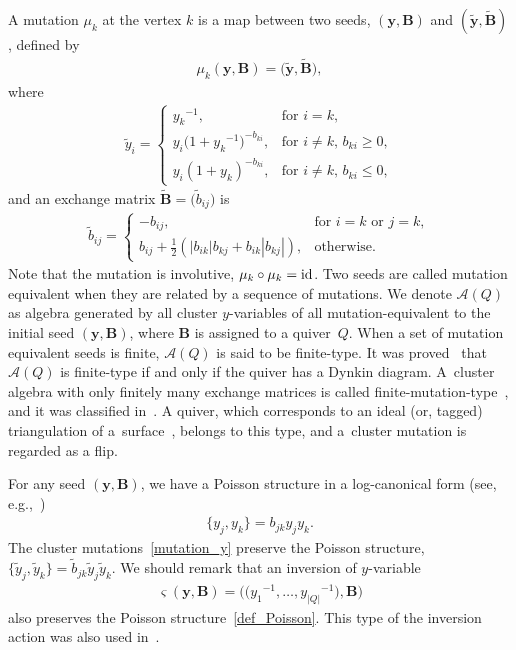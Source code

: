 \documentclass[10pt,a4paper]{amsart}
\numberwithin{equation}{section}
\begin{document}
A mutation $\mu_k$ at the vertex $k$ is a map between two seeds, $(\boldsymbol{y}, \mathbf{B})$ and $(\widetilde{\boldsymbol{y}}, \widetilde{\mathbf{B}})$, defined by
\begin{gather} \label{mutation_y}
 \mu_k( \boldsymbol{y}, \mathbf{B}) = \big(\widetilde{\boldsymbol{y}} , \widetilde{\mathbf{B}}\big) ,
\end{gather}
where
\begin{gather*}
 \widetilde{y}_i
 =
 \begin{cases}
 {y_k}^{-1} , & \text{for $i=k$}, \\
 y_i \big( 1+{y_k}^{-1} \big)^{-b_{ki}} , & \text{for $i \neq k$, $b_{ki} \geq 0$}, \\
 y_i ( 1+y_k )^{-b_{ki}} , & \text{for $i \neq k$, $b_{ki} \leq 0$},
 \end{cases}
\end{gather*}
and
an exchange matrix $ \widetilde{\mathbf{B}}= \big( \widetilde{b}_{ij} \big)$ is
\begin{gather} \label{mutation_B}
 \widetilde{b}_{ij} =
 \begin{cases}
 - b_{ij} , & \text{for $i=k$ or $j=k$}, \\
 b_{ij}+ \frac{1}{2} ( | b_{ik} | b_{kj} + b_{ik} | b_{kj} | ) , & \text{otherwise}.
 \end{cases}
\end{gather}
Note that the mutation is involutive, $\mu_k \circ \mu_k={\rm id}$. Two seeds are called mutation equivalent when they are related by a sequence of mutations. We denote $\mathcal{A}(Q)$ as algebra generated by all cluster
$y$-variables of all mutation-equivalent to the initial seed $(\boldsymbol{y}, \mathbf{B})$, where $\mathbf{B}$ is assigned to a quiver~$Q$. When a set of mutation equivalent seeds is finite, $\mathcal{A}(Q)$ is said to be
finite-type. It was proved~\cite{FominZelev03a} that $\mathcal{A}(Q)$ is finite-type if and only if the quiver has a Dynkin diagram. A~cluster algebra with only finitely many exchange matrices is called finite-mutation-type~\cite{FomiShapThur08a}, and it was classified in~\cite{FeliShapTuma12c}. A quiver, which corresponds to an ideal (or, tagged) triangulation of a~surface~\cite{FomiShapThur08a}, belongs to this type, and
a~cluster mutation is regarded as a flip.

For any seed $(\boldsymbol{y}, \mathbf{B})$, we have a Poisson structure in a log-canonical form (see, e.g.,~\cite{GekhShapVain10Book})
\begin{gather} \label{def_Poisson}
\{ y_j , y_k \} = b_{jk} y_j y_k .
\end{gather}
The cluster mutations~\eqref{mutation_y} preserve the Poisson structure, $\big\{ \widetilde{y}_j , \widetilde{y}_k\big\} =\widetilde{b}_{jk} \widetilde{y}_j \widetilde{y}_k$. We should remark that an inversion of $y$-variable
\begin{gather} \label{inversion_cluster}
 \varsigma(\boldsymbol{y}, \mathbf{B}) = \big(\big ({y_1}^{-1}, \dots, {y_{|Q|}}^{-1}\big), \mathbf{B} \big)
\end{gather}
also preserves the Poisson structure~\eqref{def_Poisson}. This type of the inversion action was also used in~\cite{BersGavrMars18a}.
\end{document}

